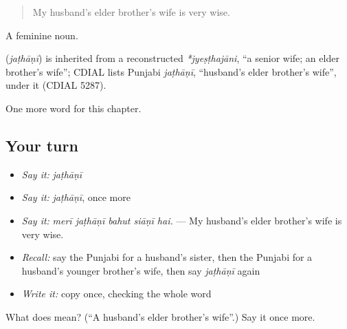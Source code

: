 \begin{quote}
My husband's elder brother's wife is very wise.
\end{quote}

A feminine noun.

\begin{cousinweb}
\textbf{} (\emph{jaṭhāṇī}) is inherited from a reconstructed \emph{*jyeṣṭhajāni}, \textquotedblleft{}a senior wife; an elder brother's wife\textquotedblright{}; CDIAL lists Punjabi \emph{jaṭhāṇī}, \textquotedblleft{}husband's elder brother's wife\textquotedblright{}, under it (CDIAL 5287).
\end{cousinweb}

\begin{grammarlens}[title={What you've built}]
One more word for this chapter.
\end{grammarlens}

\subsection*{Your turn}
\begin{itemize}
\raggedright
  \item \emph{Say it:} \emph{jaṭhāṇī}
  \item \emph{Say it:} \emph{jaṭhāṇī}, once more
  \item \emph{Say it:} \emph{merī jaṭhāṇī bahut siāṇī hai.} — My husband's elder brother's wife is very wise.
  \item \emph{Recall:} say the Punjabi for a husband's sister, then the Punjabi for a husband's younger brother's wife, then say \emph{jaṭhāṇī} again
  \item \emph{Write it:} copy \textbf{} once, checking the whole word
\end{itemize}

\begin{tcolorbox}[breakable,colback=teal!4,colframe=teal!35!black,title={Before you move on}]
What does  mean? (\textquotedblleft{}A husband's elder brother's wife\textquotedblright{}.) Say it once more.
\end{tcolorbox}
